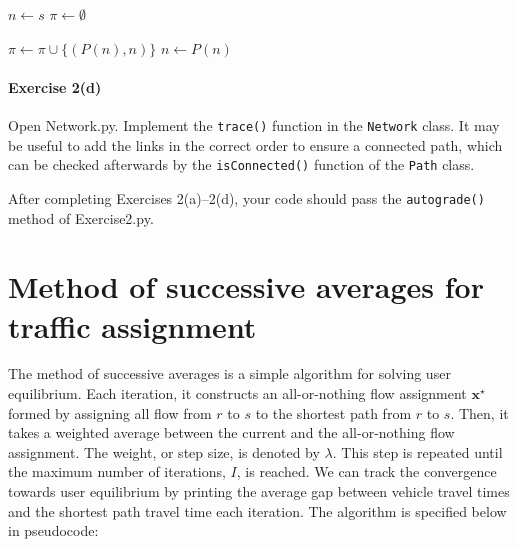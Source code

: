 \documentclass[11pt]{article}
\begin{document}
\vspace{\baselineskip}

\begin{algorithmic}[1]
	\State $n\leftarrow s$
	\State $\pi \leftarrow \emptyset$
	
	\vspace{0.5\baselineskip}
	
	\State $\pi\leftarrow \pi \cup \{(P(n),n)\}$
	\State $n\leftarrow P(n)$
	\EndWhile
	\EndProcedure
\end{algorithmic}


\paragraph*{Exercise 2(d)} Open Network.py. Implement the \texttt{trace()} function in the \texttt{Network} class. 
It may be useful to add the links in the correct order to ensure a connected path, which can be checked afterwards by the \texttt{isConnected()} function of the \texttt{Path} class.

 \vspace{\baselineskip}
 
\noindent
After completing Exercises 2(a)--2(d), your code should pass the \texttt{autograde()} method of Exercise2.py. 


\section{Method of successive averages for traffic assignment}


The method of successive averages is a simple algorithm for solving user equilibrium. Each iteration, it constructs an all-or-nothing flow assignment $\mathbf{x}^\star$ formed by assigning all flow from $r$ to $s$ to the shortest path from $r$ to $s$. Then, it takes a weighted average between the current and the all-or-nothing flow assignment. The weight, or step size, is denoted by $\lambda$. 
This step is repeated until the maximum number of iterations, $I$, is reached. We can track the convergence towards user equilibrium by printing the average gap between vehicle travel times and the shortest path travel time each iteration.
The algorithm is specified below in pseudocode:

\vspace{\baselineskip}
\end{document}
